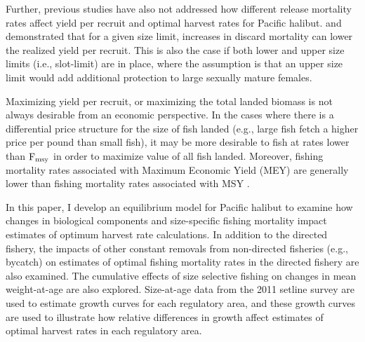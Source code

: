 Further, previous studies have also not addressed how different release mortality rates affect  yield per recruit and optimal harvest rates for Pacific halibut.  \cite{coggins2007ecm} and \cite{pineiii2008car} demonstrated that for a given size limit, increases in discard mortality can lower the realized yield per recruit. This is also the case if both lower and upper size limits (i.e., slot-limit) are in place, where the assumption is that an upper size limit would add additional protection to large sexually mature females.

Maximizing  yield per recruit, or maximizing the total landed biomass is not always desirable from an economic perspective.  In the cases where there is a differential price structure for the size of fish landed (e.g., large fish fetch a higher price per pound  than small fish), it may be more desirable to fish at rates lower than $\rm{F_{msy}}$ in order to maximize value of all fish landed.  Moreover, fishing mortality rates associated with Maximum Economic Yield (MEY) are generally lower than fishing mortality rates associated with MSY \citep{gordon1954economic}.

In this paper, I develop an equilibrium model for Pacific halibut to examine how changes in biological components and size-specific fishing mortality impact estimates of optimum harvest rate calculations.  In addition to the directed fishery, the impacts of other constant removals from non-directed fisheries (e.g., bycatch) on estimates of optimal fishing mortality rates in the directed fishery are also examined.  The cumulative effects of size selective fishing on changes in mean weight-at-age are also explored. Size-at-age data from the 2011 setline survey are used to estimate growth curves for each regulatory area, and these growth curves are used to illustrate how relative differences in growth affect estimates of optimal harvest rates in each regulatory area.





